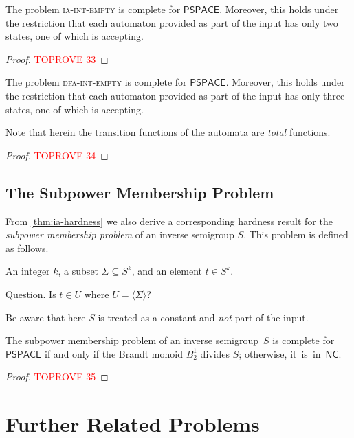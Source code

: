 \documentclass[anonymous,letter,UKenglish,cleveref,autoref,thm-restate]{lipics-v2021}
\makeatletter
\newcommand{\sse}{\subseteq}
\newcommand{\gen}[1]{\langle #1 \rangle}
\newcommand{\NC}{\ensuremath{\mathsf{NC}}\xspace}
\newcommand{\PSPACE}{\ensuremath{\mathsf{PSPACE}}\xspace}
\theoremstyle{plain}
\theoremstyle{plain}
\providecommand\iitem{}
\providecommand\qitem{}
\newcommand\decproblem@iitem@label{\rlap{Input.}\phantom{Question.}}
\newcommand\decproblem@qitem@label{Question.}
\newenvironment{decproblem}{\begin{description}\begin{samepage}\renewcommand{\iitem}{\item[\decproblem@iitem@label]}\renewcommand{\qitem}{\item[\decproblem@qitem@label]}}{\end{samepage}\end{description}}
\newcommand{\prob}[1]{\textup{\textsc{#1}}\xspace}
\newcommand{\dIEmpty}[1]{\prob{{#1}-int-empty}}
\makeatother
\begin{document}
\begin{theorem}\label{thm:ia-hardness}
  The problem \dIEmpty{ia} is complete for \PSPACE{}.
  Moreover, this holds under the restriction that each automaton provided as part of the input has only two states, one of which is accepting.
\end{theorem}
\begin{proof}\textcolor{red}{TOPROVE 33}\end{proof}

\begin{corollary}
  The problem \dIEmpty{dfa} is complete for \PSPACE{}.
  Moreover, this holds under the restriction that each automaton provided as part of the input has only three states, one of which is accepting.
\end{corollary}

Note that herein the transition functions of the automata are \emph{total} functions.
\begin{proof}\textcolor{red}{TOPROVE 34}\end{proof}


\subsection{The Subpower Membership Problem}\label{sub:subpower}

From \cref{thm:ia-hardness} we also derive a corresponding hardness result for the \emph{subpower membership problem} of an inverse semigroup $S$.
This problem is defined as follows.

\begin{decproblem}
	\iitem An integer $k$, a subset $\Sigma \sse S^k$, and an element $t \in S^k$.
	\qitem Is $t \in U$ where $U = \gen{\Sigma}$?
\end{decproblem}

Be aware that here $S$ is treated as a constant and \emph{not} part of the input.

\begin{corollary}
  The subpower membership problem of an inverse semigroup~$S$ is complete for \PSPACE if and only if the Brandt monoid $B_2^1$ divides $S$; otherwise, it~is~in~\NC.
\end{corollary}
\begin{proof}\textcolor{red}{TOPROVE 35}\end{proof}


\section{Further Related Problems}\label{sec:applications}
\end{document}
